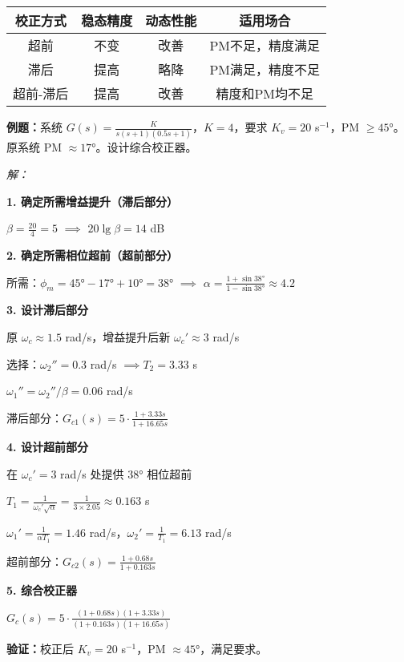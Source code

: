 \begin{minipage}[t]{0.45\textwidth}
\begin{center}
\small
\begin{tabular}{|c|c|c|c|}
\hline
\textbf{校正方式} & \textbf{稳态精度} & \textbf{动态性能} & \textbf{适用场合} \\
\hline
超前 & 不变 & 改善 & PM不足，精度满足 \\
\hline
滞后 & 提高 & 略降 & PM满足，精度不足 \\
\hline
超前-滞后 & 提高 & 改善 & 精度和PM均不足 \\
\hline
\end{tabular}
\end{center}
\end{minipage}

\vspace{0.3cm}
\textbf{例题：}系统 $G(s) = \frac{K}{s(s+1)(0.5s+1)}$，$K=4$，要求 $K_v = 20$ s$^{-1}$，PM $\geq 45°$。原系统 PM $\approx 17°$。设计综合校正器。

\textit{解：}

\textbf{1. 确定所需增益提升（滞后部分）}

$\beta = \frac{20}{4} = 5$ $\implies$ $20\lg\beta = 14$ dB

\textbf{2. 确定所需相位超前（超前部分）}

所需：$\phi_m = 45° - 17° + 10° = 38°$ $\implies$ $\alpha = \frac{1+\sin 38°}{1-\sin 38°} \approx 4.2$

\textbf{3. 设计滞后部分}

原 $\omega_c \approx 1.5$ rad/s，增益提升后新 $\omega_c' \approx 3$ rad/s

选择：$\omega_2'' = 0.3$ rad/s $\implies T_2 = 3.33$ s

$\omega_1'' = \omega_2''/\beta = 0.06$ rad/s

滞后部分：$G_{c1}(s) = 5 \cdot \frac{1+3.33s}{1+16.65s}$

\textbf{4. 设计超前部分}

在 $\omega_c' = 3$ rad/s 处提供 $38°$ 相位超前

$T_1 = \frac{1}{\omega_c'\sqrt{\alpha}} = \frac{1}{3 \times 2.05} \approx 0.163$ s

$\omega_1' = \frac{1}{\alpha T_1} = 1.46$ rad/s，$\omega_2' = \frac{1}{T_1} = 6.13$ rad/s

超前部分：$G_{c2}(s) = \frac{1+0.68s}{1+0.163s}$

\textbf{5. 综合校正器}

$G_c(s) = 5 \cdot \frac{(1+0.68s)(1+3.33s)}{(1+0.163s)(1+16.65s)}$

\textbf{验证：}校正后 $K_v = 20$ s$^{-1}$，PM $\approx 45°$，满足要求。
